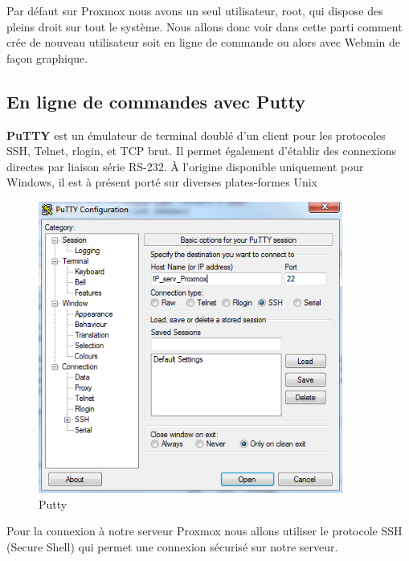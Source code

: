 \documentclass[12pt,a4paper]{article}
\begin{document}
Par défaut sur Proxmox nous avons un seul utilisateur, root, qui dispose des pleins droit sur tout le système. Nous allons donc voir dans cette parti comment crée de nouveau utilisateur soit en ligne de commande ou alors avec Webmin de façon graphique.

\subsection{En ligne de commandes avec Putty}
\textbf{PuTTY} est un émulateur de terminal doublé d'un client pour les protocoles SSH, Telnet, rlogin, et TCP brut. Il permet également d'établir des connexions directes par liaison série RS-232. À l'origine disponible uniquement pour Windows, il est à présent porté sur diverses plates-formes Unix 

\begin{figure}[!ht]
\center
\includegraphics[width=10cm]{Images/7.PNG}  
\caption{Putty}
\end{figure}

Pour la connexion à notre serveur Proxmox nous allons utiliser le protocole SSH (Secure Shell) qui permet une connexion sécurisé sur notre serveur.
\end{document}
